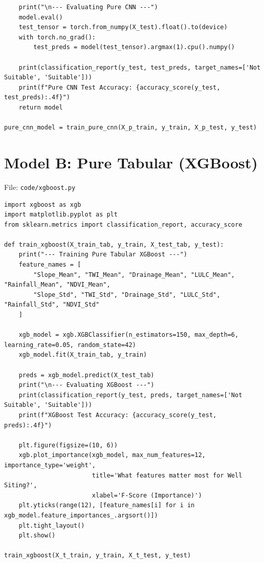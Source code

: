 \documentclass[12pt,a4paper]{report}
\begin{document}
\begin{lstlisting}
    print("\n--- Evaluating Pure CNN ---")
    model.eval()
    test_tensor = torch.from_numpy(X_test).float().to(device)
    with torch.no_grad():
        test_preds = model(test_tensor).argmax(1).cpu().numpy()
    
    print(classification_report(y_test, test_preds, target_names=['Not Suitable', 'Suitable']))
    print(f"Pure CNN Test Accuracy: {accuracy_score(y_test, test_preds):.4f}")
    return model

pure_cnn_model = train_pure_cnn(X_p_train, y_train, X_p_test, y_test)
\end{lstlisting}

\section{Model B: Pure Tabular (XGBoost)}
\begin{wiseNote}
File: \texttt{code/xgboost.py}
\end{wiseNote}
\lstset{style=wise,language=Python}
\begin{lstlisting}
import xgboost as xgb
import matplotlib.pyplot as plt
from sklearn.metrics import classification_report, accuracy_score

def train_xgboost(X_train_tab, y_train, X_test_tab, y_test):
    print("--- Training Pure Tabular XGBoost ---")
    feature_names = [
        "Slope_Mean", "TWI_Mean", "Drainage_Mean", "LULC_Mean", "Rainfall_Mean", "NDVI_Mean",
        "Slope_Std", "TWI_Std", "Drainage_Std", "LULC_Std", "Rainfall_Std", "NDVI_Std"
    ]
    
    xgb_model = xgb.XGBClassifier(n_estimators=150, max_depth=6, learning_rate=0.05, random_state=42)
    xgb_model.fit(X_train_tab, y_train)
    
    preds = xgb_model.predict(X_test_tab)
    print("\n--- Evaluating XGBoost ---")
    print(classification_report(y_test, preds, target_names=['Not Suitable', 'Suitable']))
    print(f"XGBoost Test Accuracy: {accuracy_score(y_test, preds):.4f}")
    
    plt.figure(figsize=(10, 6))
    xgb.plot_importance(xgb_model, max_num_features=12, importance_type='weight',
                        title='What features matter most for Well Siting?',
                        xlabel='F-Score (Importance)')
    plt.yticks(range(12), [feature_names[i] for i in xgb_model.feature_importances_.argsort()])
    plt.tight_layout()
    plt.show()

train_xgboost(X_t_train, y_train, X_t_test, y_test)
\end{lstlisting}
\end{document}

